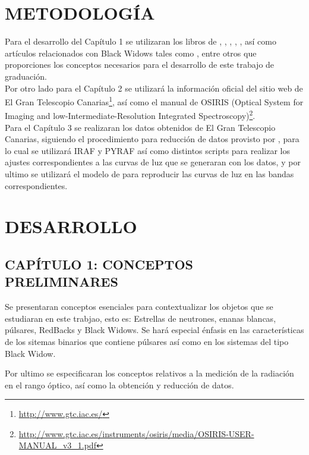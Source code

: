 \chapter{METODOLOGÍA}
Para el desarrollo del Cap\'itulo 1 se utilizaran los libros de \citet{1983-shapiro}, \citet{Camenzind2007}, \citet{Carroll2007}, \citet{karttunen2007fundamental}, \citet{1986Rybicki-Radiative-Pro-Ast}, as\'i como artículos relacionados con Black Widows tales como \citet{1988Eichler-On-Black-widow},  \citet{van2011} entre otros que proporciones los conceptos necesarios para el desarrollo de este trabajo de graduación.\\

Por otro lado para el Cap\'itulo 2 se utilizar\'a la información oficial del sitio web de El Gran Telescopio Canarias\footnote{\url{http://www.gtc.iac.es/}}, as\'i como el manual de OSIRIS (Optical System for Imaging and low-Intermediate-Resolution Integrated Spectroscopy)\footnote{\url{http://www.gtc.iac.es/instruments/osiris/media/OSIRIS-USER-MANUAL_v3_1.pdf}}.\\

Para el Cap\'itulo 3 se realizaran los datos obtenidos de El Gran Telescopio Canarias, siguiendo el procedimiento para reducción de datos provisto por \citet{AvilaOAN}, para lo cual se utilizar\'a IRAF y PYRAF as\'i como distintos scripts para realizar los ajustes correspondientes a las curvas de luz que se generaran con los datos, y por ultimo se utilizar\'a el modelo de \citet{2013Zharikov-model-catalysmic} para reproducir las curvas de luz en las bandas correspondientes.

\chapter{DESARROLLO}

\section*{CAP\'ITULO 1: CONCEPTOS PRELIMINARES}
Se presentaran conceptos esenciales para contextualizar los objetos que se estudiaran en este trabjao, esto es: Estrellas de neutrones, enanas blancas, p\'ulsares, RedBacks y Black Widows. Se har\'a especial énfasis en las características de los sitemas binarios que contiene p\'ulsares así como en los sistemas del tipo Black Widow.

Por ultimo se especificaran los conceptos relativos a la medición de la radiación en el rango óptico, as\'i como la obtención y reducción  de datos.

